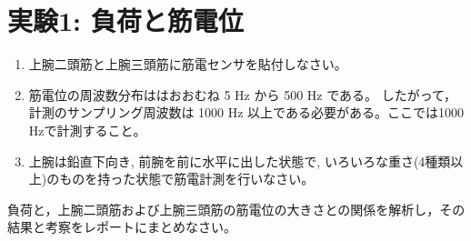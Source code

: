 \documentclass{jsarticle}
\begin{document}


\section{実験1: 負荷と筋電位}

\begin{enumerate}
  \item 上腕二頭筋と上腕三頭筋に筋電センサを貼付しなさい。
  \item 筋電位の周波数分布ははおおむね 5 Hz から 500 Hz である。
  したがって，計測のサンプリング周波数は 1000 Hz 以上である必要がある。ここでは1000 Hzで計測すること。
  \item 上腕は鉛直下向き, 前腕を前に水平に出した状態で, いろいろな重さ(4種類以上)のものを持った状態で筋電計測を行いなさい。 
\end{enumerate}  


負荷と，上腕二頭筋および上腕三頭筋の筋電位の大きさとの関係を解析し，その結果と考察をレポートにまとめなさい。
\end{document}
